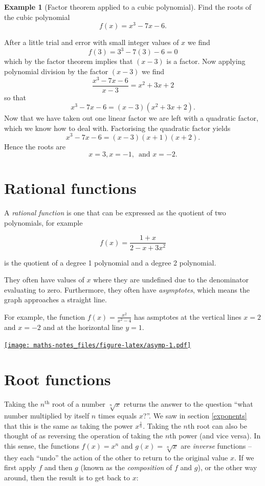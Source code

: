 \documentclass[
]{book}
\theoremstyle{definition}
\theoremstyle{definition}
\newtheorem{example}{Example}[chapter]
\theoremstyle{definition}
\theoremstyle{definition}
\theoremstyle{remark}
\begin{document}
\begin{example}[Factor theorem applied to a cubic polynomial]
\protect\hypertarget{exm:factorthmcubic}{}\label{exm:factorthmcubic}Find the roots of the cubic polynomial \[f(x)=x^3-7x-6.\]

After a little trial and error with small integer values of \(x\) we find
\[f(3)=3^3-7(3)-6=0\]
which by the factor theorem implies that \((x-3)\) is a factor. Now applying polynomial division by the factor \((x-3)\) we find
\[\frac{x^3-7x-6}{x-3}=x^2+3x+2\]
so that
\[x^3-7x-6=(x-3)(x^2+3x+2).\]
Now that we have taken out one linear factor we are left with a quadratic factor, which we know how to deal with. Factorising the quadratic factor yields
\[x^3-7x-6=(x-3)(x+1)(x+2).\]
Hence the roots are
\[x=3, x=-1,\,\text{ and } x=-2.\]
\end{example}

\hypertarget{rational-functions}{%
\section{Rational functions}\label{rational-functions}}

A \emph{rational function} is one that can be expressed as the quotient of two polynomials, for example

\[f(x)=\frac{1+x}{2-x+3x^2}\]

is the quotient of a degree 1 polynomial and a degree 2 polynomial.

They often have values of \(x\) where they are undefined due to the denominator evaluating to zero. Furthermore, they often have \emph{asymptotes}, which means the graph approaches a straight line.

For example, the function \(f(x)=\frac{x^{2}}{x^{2}-4}\) has asmptotes at the vertical lines \(x=2\) and \(x=-2\) and at the horizontal line \(y=1\).

\href{https://www.desmos.com/calculator/m4ssgias64}{\texttt{[image: maths-notes\_files/figure-latex/asymp-1.pdf]}}

\hypertarget{root-functions}{%
\section{Root functions}\label{root-functions}}

Taking the \(n^\text{th}\) root of a number \(\sqrt[n]{x}\) returns the answer to the question ``what number multiplied by itself \(n\) times equals \(x\)?''. We saw in section \ref{exponents} that this is the same as taking the power \(x^\frac{1}{n}\). Taking the \(n\)th root can also be thought of as reversing the operation of taking the \(n\)th power (and vice versa). In this sense, the functions \(f(x)=x^n\) and \(g(x)=\sqrt[n]{x}\) are \emph{inverse} functions -- they each ``undo'' the action of the other to return to the original value \(x\). If we first apply \(f\) and then \(g\) (known as the \emph{composition} of \(f\) and \(g\)), or the other way around, then the result is to get back to \(x\):
\end{document}
